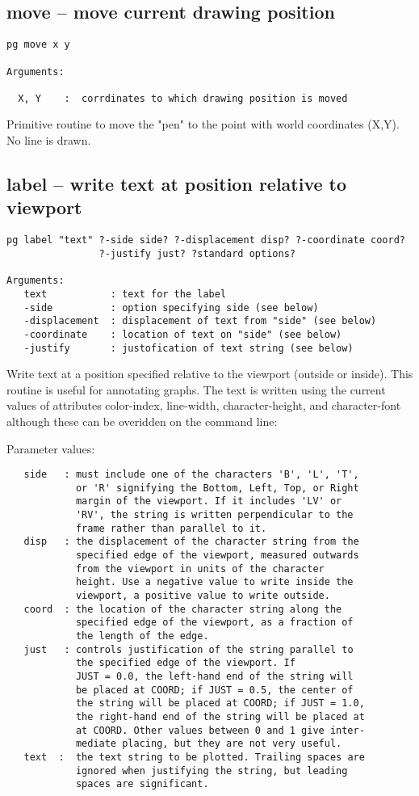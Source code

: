 \subsection{move -- move current drawing position}
\begin{verbatim}
pg move x y

Arguments:

  X, Y    :  corrdinates to which drawing position is moved
\end{verbatim}
Primitive routine to move the "pen" to the point with world
coordinates (X,Y). No line is drawn.



\subsection{label -- write text at position relative to viewport}
\begin{verbatim}
pg label "text" ?-side side? ?-displacement disp? ?-coordinate coord?
                ?-justify just? ?standard options?

Arguments:
   text           : text for the label
   -side          : option specifying side (see below)
   -displacement  : displacement of text from "side" (see below)
   -coordinate    : location of text on "side" (see below)
   -justify       : justofication of text string (see below)
\end{verbatim}
Write text at a position specified relative to the viewport (outside
or inside).  This routine is useful for annotating graphs.  The text is 
written using the current values of attributes color-index, line-width, 
character-height, and character-font although these can be overidden
on the command line:

Parameter values:
\begin{verbatim}
   side   : must include one of the characters 'B', 'L', 'T',
            or 'R' signifying the Bottom, Left, Top, or Right
            margin of the viewport. If it includes 'LV' or
            'RV', the string is written perpendicular to the
            frame rather than parallel to it.
   disp   : the displacement of the character string from the
            specified edge of the viewport, measured outwards
            from the viewport in units of the character
            height. Use a negative value to write inside the
            viewport, a positive value to write outside.
   coord  : the location of the character string along the
            specified edge of the viewport, as a fraction of
            the length of the edge.
   just   : controls justification of the string parallel to
            the specified edge of the viewport. If
            JUST = 0.0, the left-hand end of the string will
            be placed at COORD; if JUST = 0.5, the center of
            the string will be placed at COORD; if JUST = 1.0,
            the right-hand end of the string will be placed at
            at COORD. Other values between 0 and 1 give inter-
            mediate placing, but they are not very useful.
   text  :  the text string to be plotted. Trailing spaces are
            ignored when justifying the string, but leading
            spaces are significant.
\end{verbatim}

